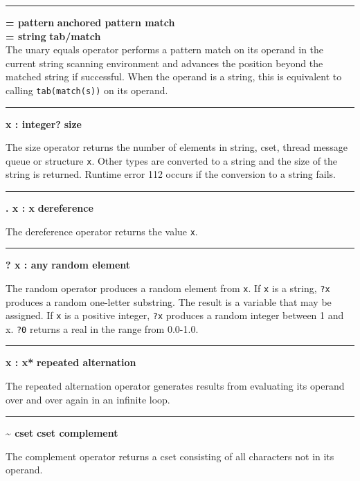 \bigskip\hrule\vspace{0.1cm}
\noindent
{\bf = pattern } \hfill {\bf anchored pattern match} \\
{\bf = string } \hfill {\bf tab/match} \\

\noindent
{}The unary equals operator
performs a pattern match on its operand in the current string scanning
environment and advances the position beyond the matched string
if successful.
When the operand is a string, this is
equivalent to calling \texttt{tab(match(s))} on its operand.

\bigskip\hrule\vspace{0.1cm}
\noindent
{\bf * x : integer? } \hfill {\bf size}

\noindent
The size operator returns the number of elements in
string, cset, thread message queue or structure \texttt{x}.
Other types are converted to a string and the size of the string is returned.
Runtime error 112 occurs if the conversion to a string fails.

\bigskip\hrule\vspace{0.1cm}
\noindent
{\bf . x : x } \hfill {\bf dereference}

\noindent
The dereference operator returns the value
\texttt{x}.

\bigskip\hrule\vspace{0.1cm}
\noindent
{\bf ? x : any } \hfill {\bf random element}

\noindent
The random operator produces a random element
from \texttt{x}. If \texttt{x} is a string, \texttt{?x} produces a
random one-letter substring. The result is a variable that may be
assigned. If \texttt{x} is a positive integer, \texttt{?x} produces a
random integer between 1 and x.  \texttt{?0} returns a real in the
range from 0.0-1.0.

\bigskip\hrule\vspace{0.1cm}
\noindent
{\bf {\textbar} x : x* } \hfill {\bf repeated alternation}

\noindent
The repeated alternation operator generates
results from evaluating its operand over and over again in an infinite
loop.

\bigskip\hrule\vspace{0.1cm}
\noindent
{\bf \~{} cset } \hfill {\bf cset complement}

\noindent
The complement operator returns a cset
consisting of all characters not in its operand.

